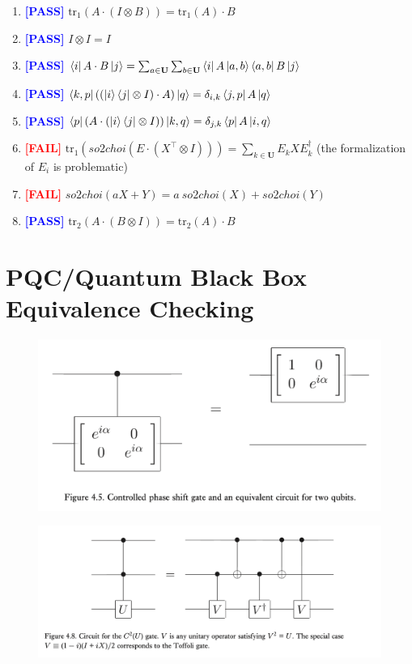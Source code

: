 \documentclass[manuscript, review, timestamp]{acmart}
\newcommand{\tr}{\mathrm{tr}}
\newcommand{\pass}{\textcolor{blue}{\textbf{ [PASS] }}}
\newcommand{\fail}{\textcolor{red}{\textbf{ [FAIL] }}}
\begin{document}
\begin{enumerate}
  \item \pass $\tr_1 (A \cdot (I \otimes B)) = \tr_1 (A) \cdot B$
  \item \pass $I \otimes I = I$
  \item \pass $\bra{i} A \cdot B \ket{j} = \sum_{a\in\mathbf{U}} \sum_{b\in\mathbf{U}} \bra{i}A\ket{a,b}\bra{a,b}B\ket{j}$
  \item \pass $\bra{k,p} ((\ket{i}\bra{j} \otimes I) \cdot A) \ket{q} = \delta_{i, k} \bra{j, p} A \ket{q}$
  \item \pass $\bra{p} (A \cdot (\ket{i}\bra{j} \otimes I)) \ket{k, q} = \delta_{j, k} \bra{p} A \ket{i, q}$
  \item \fail $\tr_1(so2choi(E \cdot (X^\top \otimes I))) = \sum_{k\in\mathbf{U}} E_k X E_k^\dagger$ (the formalization of $E_i$ is problematic)
  \item \fail $so2choi(a X + Y) =a\ so2choi(X) + so2choi(Y)$
  \item \pass $\tr_2(A \cdot (B \otimes I)) = \tr_2(A) \cdot B$
\end{enumerate}

\clearpage
\appendix 

\section{PQC/Quantum Black Box Equivalence Checking}
\begin{figure}[h]
  \includegraphics*[width=\textwidth]{QCQI.Fig4.5.png}
\end{figure}

\begin{figure}[h]
  \includegraphics*[width=\textwidth]{QCQI.Fig4.8.png}
\end{figure}
\end{document}
